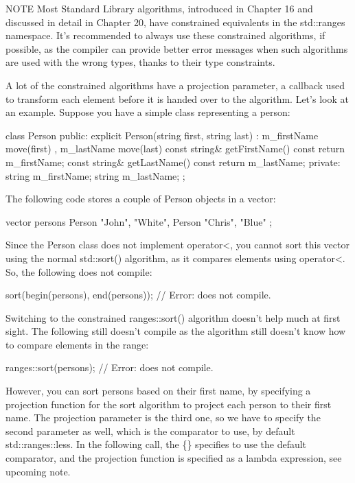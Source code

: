 \begin{myNotic}{NOTE}
Most Standard Library algorithms, introduced in Chapter 16 and discussed in detail in Chapter 20, have constrained equivalents in the std::ranges namespace. It’s recommended to always use these constrained algorithms, if possible, as the compiler can provide better error messages when such algorithms are used with the wrong types, thanks to their type constraints.
\end{myNotic}


A lot of the constrained algorithms have a projection parameter, a callback used to transform each element before it is handed over to the algorithm. Let’s look at an example. Suppose you have a simple class representing a person:

\begin{cpp}
class Person
{
    public:
        explicit Person(string first, string last)
            : m_firstName { move(first) }, m_lastName { move(last) } { }
        const string& getFirstName() const { return m_firstName; }
        const string& getLastName() const { return m_lastName; }
    private:
        string m_firstName;
        string m_lastName;
};
\end{cpp}

The following code stores a couple of Person objects in a vector:

\begin{cpp}
vector persons { Person {"John", "White"}, Person {"Chris", "Blue"} };
\end{cpp}

Since the Person class does not implement operator<, you cannot sort this vector using the normal std::sort() algorithm, as it compares elements using operator<. So, the following does not compile:

\begin{cpp}
sort(begin(persons), end(persons)); // Error: does not compile.
\end{cpp}

Switching to the constrained ranges::sort() algorithm doesn’t help much at first sight. The following still doesn’t compile as the algorithm still doesn’t know how to compare elements in the range:

\begin{cpp}
ranges::sort(persons); // Error: does not compile.
\end{cpp}

However, you can sort persons based on their first name, by specifying a projection function for the sort algorithm to project each person to their first name. The projection parameter is the third one, so we have to specify the second parameter as well, which is the comparator to use, by default std::ranges::less. In the following call, the \{\} specifies to use the default comparator, and the projection function is specified as a lambda expression, see upcoming note.


